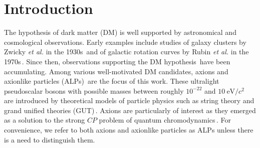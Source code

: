 \documentclass[superscriptaddress,
floatfix,
reprint,
nofootinbib,
amsmath,amssymb,
aps,
prd,
]{revtex4-2}
\begin{document}
\maketitle

\section{Introduction}

The hypothesis of dark matter (DM) is well supported by astronomical and cosmological observations. 
Early examples include studies of galaxy clusters by Zwicky \textit{et al.} in the 1930s\,\cite{zwicky1933redshift,zwicky1979masses} and of galactic rotation curves by Rubin \textit{et al.} in the 1970s\,\cite{rubin1970rotation}.
Since then, observations supporting the DM hypothesis\,\cite{ade2016planck, bartelmann2010gravitational,Clowe_2006_DirectEmpiricalProof,Harvey_2015,jedamzik2009big} have been accumulating.
Among various well-motivated DM candidates, axions and axionlike particles (ALPs)\,\cite{berezhiani1992primordial, annurevAxionSearches, chadhaday2022axiondarkmatternow, Kimball2023_search} are the focus of this work. 
These ultralight pseudoscalar bosons with possible masses between roughly $10^{-22}$ and $\SI{10}{\eV/c^2}$\,\cite{GrahamStochasticAxion} are introduced by theoretical models of particle physics such as string theory and grand unified theories (GUT)\,\cite{Preskill1983_invisible_axion, Abbott1982_Cosmological_Axion, Dine1983_not_so_harmless_axion,svrcek2006axions, berezhiani1991cosmology}.
Axions are particularly of interest as they emerged as a solution to the strong $CP$ problem of quantum chromodynamics\,\cite{PecceiQuinn1977_CPConservation_PRL, PecceiQuinn1977_ConstraintsCP_PRD}. 
For convenience, we refer to both axions and axionlike particles as ALPs unless there is a need to distinguish them.
\end{document}
